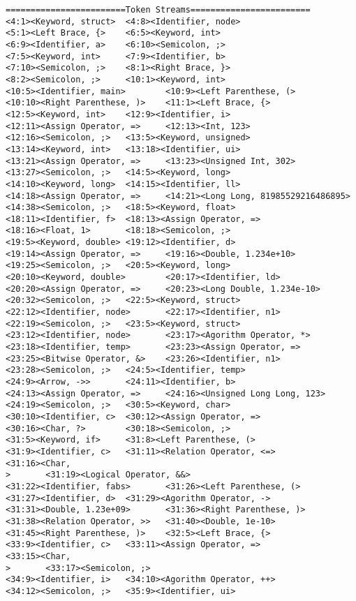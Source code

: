 \documentclass[lang=cn,11pt,a4paper]{paper}
\begin{document}
\begin{lstlisting}
========================Token Streams========================
<4:1><Keyword, struct>  <4:8><Identifier, node>
<5:1><Left Brace, {>    <6:5><Keyword, int>
<6:9><Identifier, a>    <6:10><Semicolon, ;>
<7:5><Keyword, int>     <7:9><Identifier, b>
<7:10><Semicolon, ;>    <8:1><Right Brace, }>
<8:2><Semicolon, ;>     <10:1><Keyword, int>
<10:5><Identifier, main>        <10:9><Left Parenthese, (>
<10:10><Right Parenthese, )>    <11:1><Left Brace, {>
<12:5><Keyword, int>    <12:9><Identifier, i>
<12:11><Assign Operator, =>     <12:13><Int, 123>
<12:16><Semicolon, ;>   <13:5><Keyword, unsigned>
<13:14><Keyword, int>   <13:18><Identifier, ui>
<13:21><Assign Operator, =>     <13:23><Unsigned Int, 302>
<13:27><Semicolon, ;>   <14:5><Keyword, long>
<14:10><Keyword, long>  <14:15><Identifier, ll>
<14:18><Assign Operator, =>     <14:21><Long Long, 81985529216486895>
<14:38><Semicolon, ;>   <18:5><Keyword, float>
<18:11><Identifier, f>  <18:13><Assign Operator, =>
<18:16><Float, 1>       <18:18><Semicolon, ;>
<19:5><Keyword, double> <19:12><Identifier, d>
<19:14><Assign Operator, =>     <19:16><Double, 1.234e+10>
<19:25><Semicolon, ;>   <20:5><Keyword, long>
<20:10><Keyword, double>        <20:17><Identifier, ld>
<20:20><Assign Operator, =>     <20:23><Long Double, 1.234e-10>
<20:32><Semicolon, ;>   <22:5><Keyword, struct>
<22:12><Identifier, node>       <22:17><Identifier, n1>
<22:19><Semicolon, ;>   <23:5><Keyword, struct>
<23:12><Identifier, node>       <23:17><Agorithm Operator, *>
<23:18><Identifier, temp>       <23:23><Assign Operator, =>
<23:25><Bitwise Operator, &>    <23:26><Identifier, n1>
<23:28><Semicolon, ;>   <24:5><Identifier, temp>
<24:9><Arrow, ->>       <24:11><Identifier, b>
<24:13><Assign Operator, =>     <24:16><Unsigned Long Long, 123>
<24:19><Semicolon, ;>   <30:5><Keyword, char>
<30:10><Identifier, c>  <30:12><Assign Operator, =>
<30:16><Char, ?>        <30:18><Semicolon, ;>
<31:5><Keyword, if>     <31:8><Left Parenthese, (>
<31:9><Identifier, c>   <31:11><Relation Operator, <=>
<31:16><Char,
>       <31:19><Logical Operator, &&>
<31:22><Identifier, fabs>       <31:26><Left Parenthese, (>
<31:27><Identifier, d>  <31:29><Agorithm Operator, ->
<31:31><Double, 1.23e+09>       <31:36><Right Parenthese, )>
<31:38><Relation Operator, >>   <31:40><Double, 1e-10>
<31:45><Right Parenthese, )>    <32:5><Left Brace, {>
<33:9><Identifier, c>   <33:11><Assign Operator, =>
<33:15><Char,
>       <33:17><Semicolon, ;>
<34:9><Identifier, i>   <34:10><Agorithm Operator, ++>
<34:12><Semicolon, ;>   <35:9><Identifier, ui>

\end{lstlisting}
\end{document}
